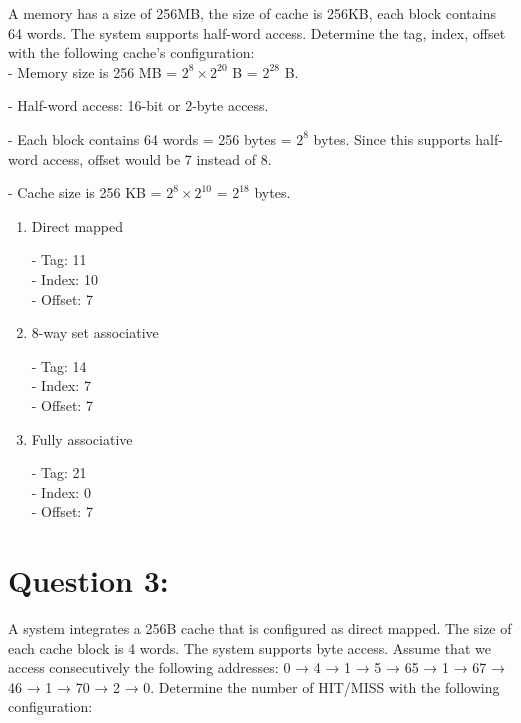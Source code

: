 \documentclass[12pt,a4paper]{article}
\begin{document}
A memory has a size of 256MB, the size of cache is 256KB, each block contains 64 words. The system supports half-word access. Determine the tag, index, offset with the following cache’s configuration: \\

- Memory size is 256 MB = $2^{8} \times 2^{20}$ B = $2^{28}$ B.

- Half-word access: 16-bit or 2-byte access.

- Each block contains 64 words = 256 bytes = $2^8$ bytes. Since this supports half-word access, offset would be 7 instead of 8.

- Cache size is 256 KB = $2^8 \times 2^{10}$ = $2^{18}$ bytes.

\begin{enumerate}
  \item Direct mapped

        - Tag:  11 \\ %
        - Index:  10 \\ %
        - Offset: 7

  \item 8-way set associative

        - Tag: 14 \\ %
        - Index: 7 \\ %
        - Offset: 7

  \item Fully associative

        - Tag: 21 \\
        - Index: 0 \\
        - Offset: 7

\end{enumerate}


\section*{Question 3:}

A system integrates a 256B cache that is configured as direct mapped. The size of each cache block is 4 words. The system supports byte access. Assume that we access consecutively the following addresses:
0 → 4 → 1 → 5 → 65 → 1 → 67 → 46 → 1 → 70 → 2 → 0.
Determine the number of HIT/MISS with the following configuration:
\end{document}
